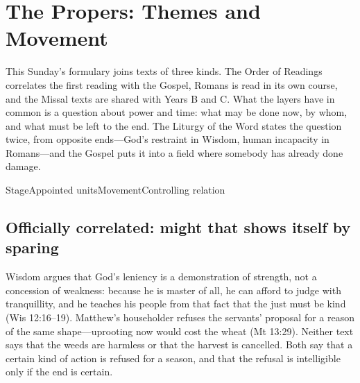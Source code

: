 \section*{The Propers: Themes and Movement}

This Sunday's formulary joins texts of three kinds. The Order of Readings
correlates the first reading with the Gospel, Romans is read in its own
course, and the Missal texts are shared with Years B and C. What the layers
have in common is a question about power
and time: what may be done now, by whom, and what must be left to the end.
The Liturgy of the Word states the question twice, from opposite ends---God's
restraint in Wisdom, human incapacity in Romans---and the Gospel puts it into
a field where somebody has already done damage.

\begin{fourcoltable}{Stage}{Appointed units}{Movement}{Controlling relation}
\end{fourcoltable}

\subsection*{Officially correlated: might that shows itself by sparing}

Wisdom argues that God's leniency is a demonstration of strength, not a
concession of weakness: because he is master of all, he can afford to judge
with tranquillity, and he teaches his people from that fact that the just must
be kind (Wis 12:16--19). Matthew's householder refuses the servants'
proposal for a reason of the same shape---uprooting now would cost the wheat
(Mt 13:29). Neither text says that the weeds are harmless or that the harvest
is cancelled. Both say that a certain kind of action is refused for a season,
and that the refusal is intelligible only if the end is certain.

